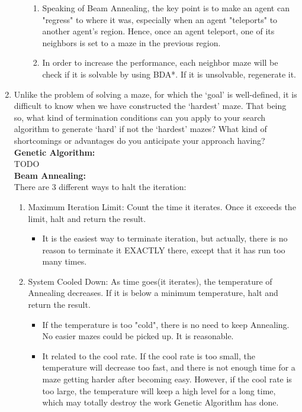 \documentclass[letter]{article}
\begin{document}
\begin{enumerate}[resume]
\begin{enumerate}
\begin{enumerate}
				\item {Speaking of Beam Annealing, the key point is to make an agent can "regress" to where it was, especially when an agent "teleports" to another agent's region. Hence, once an agent teleport, one of its neighbors is set to a maze in the previous region.} \\
				
				\item {In order to increase the performance, each neighbor maze will be check if it is solvable by using BDA*. If it is unsolvable, regenerate it.}
			\end{enumerate}
		\end{enumerate}
		
		\item {Unlike the problem of solving a maze, for which the ‘goal’ is well-defined, it is difficult to know when we have constructed the ‘hardest’ maze. That being so, what kind of termination conditions can you apply to your search algorithm to generate ‘hard’ if not the ‘hardest’ mazes? What kind of shortcomings or advantages do you anticipate your approach having?} \\
		
		\textbf{Genetic Algorithm:} \\
		TODO\\
		
		\textbf{Beam Annealing:} \\
		There are 3 different ways to halt the iteration: \\
		\begin{enumerate}
			\item {Maximum Iteration Limit: Count the time it iterates. Once it exceeds the limit, halt and return the result.} 
			\begin{itemize}
				\item {It is the easiest way to terminate iteration, but actually, there is no reason to terminate it EXACTLY there, except that it has run too many times.}
			\end{itemize}
		
			\item {System Cooled Down: As time goes(it iterates), the temperature of Annealing decreases. If it is below a minimum temperature, halt and return the result.} 
			\begin{itemize}
				\item {If the temperature is too "cold", there is no need to keep Annealing. No easier mazes could be picked up. It is reasonable.}
				\item {It related to the cool rate. If the cool rate is too small, the temperature will decrease too fast, and there is not enough time for a maze getting harder after becoming easy. However, if the cool rate is too large, the temperature will keep a high level for a long time, which may totally destroy the work Genetic Algorithm has done.}
			\end{itemize}
		

\end{enumerate}
\end{enumerate}
\end{document}
